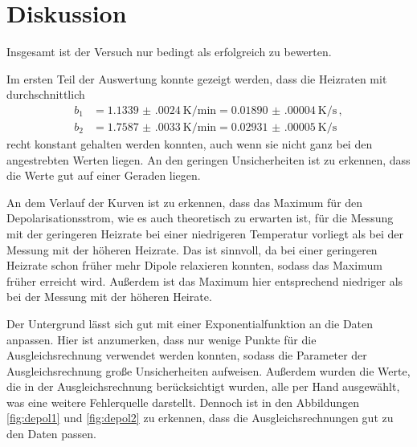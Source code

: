 \newpage
\section{Diskussion}
\label{sec:Diskussion}

Insgesamt ist der Versuch nur bedingt als erfolgreich zu bewerten.

Im ersten Teil der Auswertung konnte gezeigt werden, dass die Heizraten mit
durchschnittlich
\begin{align*}
  b_1&=\SI{1.1339(0024)}{\kelvin\per\minute}= \SI{0.01890(00004)}{\kelvin\per\second}\,, \\
  b_2&=\SI{1.7587(0033)}{\kelvin\per\minute}= \SI{0.02931(00005)}{\kelvin\per\second}\,
\end{align*}
recht konstant gehalten werden konnten, auch wenn sie nicht ganz bei den angestrebten
Werten liegen. An den geringen Unsicherheiten ist zu erkennen, dass die Werte gut auf einer
Geraden liegen.

An dem Verlauf der Kurven ist zu erkennen, dass das Maximum für den Depolarisationsstrom,
wie es auch theoretisch zu erwarten ist, für die Messung mit der geringeren Heizrate bei
einer niedrigeren Temperatur vorliegt als bei der Messung mit der höheren Heizrate. Das ist
sinnvoll, da bei einer geringeren Heizrate schon früher mehr Dipole relaxieren konnten, sodass
das Maximum früher erreicht wird. Außerdem ist das Maximum hier entsprechend niedriger als
bei der Messung mit der höheren Heirate.

Der Untergrund lässt sich gut mit einer Exponentialfunktion an die Daten anpassen.
Hier ist anzumerken, dass nur wenige Punkte für die Ausgleichsrechnung verwendet
werden konnten, sodass die Parameter der Ausgleichsrechnung große Unsicherheiten
aufweisen. Außerdem wurden die Werte, die in der Ausgleichsrechnung berücksichtigt wurden,
alle per Hand ausgewählt, was eine weitere Fehlerquelle darstellt. Dennoch ist in den
Abbildungen \ref{fig:depol1} und \ref{fig:depol2} zu erkennen, dass die Ausgleichsrechnungen
gut zu den Daten passen.

